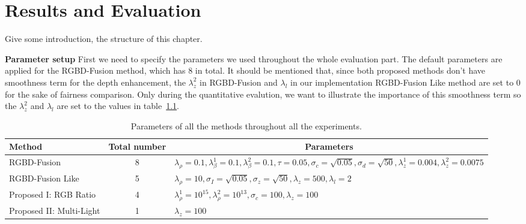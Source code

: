 \chapter{Results and Evaluation} \label{chap:result}
{\color{red}Give some introduction, the structure of this chapter.}

\textbf{Parameter setup}
First we need to specify the parameters we used throughout the whole evaluation part. 
The default parameters are applied for the RGBD-Fusion method, which has 8 in total. 
It should be mentioned that, since both proposed methods don't have smoothness term for the depth enhancement, the $\lambda_z^2$ in RGBD-Fusion and $\lambda_l$ in our implementation RGBD-Fusion Like method are set to 0 for the sake of fairness comparison.
Only during the quantitative evalution, we want to illustrate the importance of this smoothness term so the $\lambda_z^2$ and $\lambda_l$ are set to the values in table~\ref{tab:parameter_setup}.

\begin{table}[!ht]
\caption{Parameters of all the methods throughout all the experiments.}
\label{tab:parameter_setup}
\centering
\begin{tabular}{|m{4cm} |m{1.5cm} |m{7cm}|}
\hline
Method                               & \multicolumn{1}{c|}{Total number} & \multicolumn{1}{c|}{Parameters}                                                                                                                                          \\ \hline
RGBD-Fusion~\cite{or2015rgbd} & \multicolumn{1}{c|}{8}            &{$\lambda_\rho = 0.1, \lambda_\beta^1 = 0.1, \lambda_\beta^2 = 0.1, \tau = 0.05, \sigma_c = \sqrt{0.05}, \sigma_d = \sqrt{50}, \lambda_z^1 = 0.004, \lambda_z^2 = 0.0075$} \\ \hline
RGBD-Fusion Like                    & \multicolumn{1}{c|}{5}             & {$\lambda_{\rho} = 10, \sigma_I = \sqrt{0.05}, \sigma_z = \sqrt{50}, \lambda_z = 500, \lambda_l = 2$}                                                                                                                                                                         \\ \hline
Proposed I: RGB Ratio                            & \multicolumn{1}{c|}{4}             & $\lambda_{\rho}^1 = 10^{15}, \lambda_{\rho}^2 = 10^{13}, \sigma_c = 100, \lambda_z = 100$                                                                                                                                                                                                                                                                                                                                                  \\ \hline
Proposed II: Multi-Light                          & \multicolumn{1}{c|}{1}            & $\lambda_z = 100$                                                                                                                                                                          \\ \hline
\end{tabular}
\end{table}


